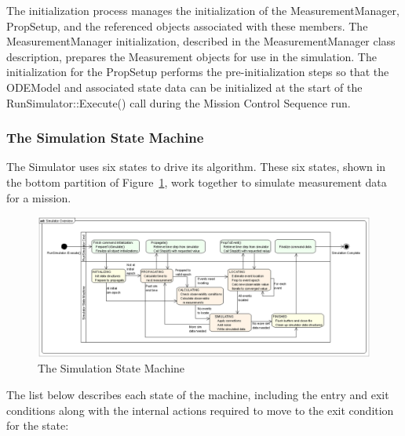 The initialization process manages the initialization of the MeasurementManager, PropSetup, and the referenced objects associated with these members.  The MeasurementManager initialization, described in the MeasurementManager class description, prepares the Measurement objects for use in the simulation.  The initialization for the PropSetup performs the pre-initialization steps so that the ODEModel and associated state data can be initialized at the start of the RunSimulator::Execute() call during the Mission Control Sequence run.

\subsubsection{The Simulation State Machine}

The Simulator uses six states to drive its algorithm.  These six states, shown in the bottom partition of Figure~\ref{fig:SimulatorStateMachine}, work together to simulate measurement data for a mission.

\begin{figure}[htbp]
\begin{center}
\includegraphics[scale=0.39]{Images/SimulatorOverview.eps}
\caption{\label{fig:SimulatorStateMachine}The Simulation State Machine}
\end{center}
\end{figure}

The list below describes each state of the machine, including the entry and exit conditions along with the internal actions required to move to the exit condition for the state:

